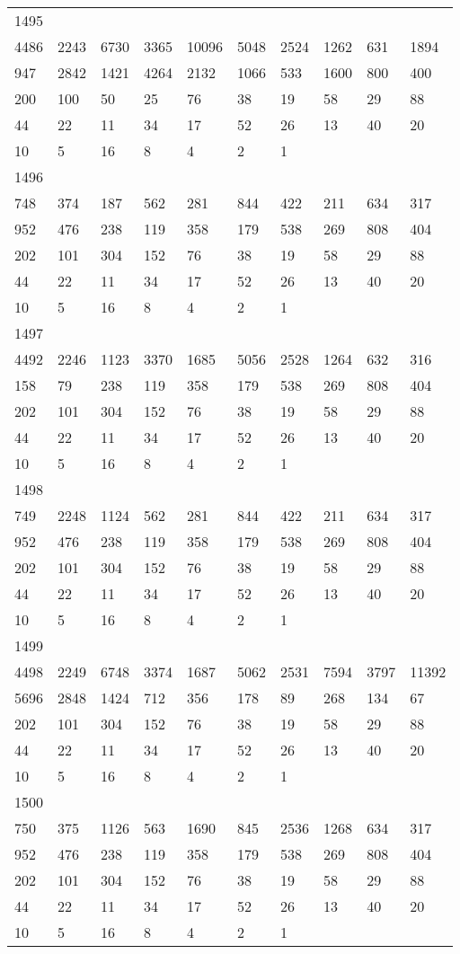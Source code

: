 \begin{longtable}{*{10}{l}}
1495&&&&&&&&&\\
4486& 2243& 6730& 3365& 10096& 5048& 2524& 1262& 631& 1894\\
947& 2842& 1421& 4264& 2132& 1066& 533& 1600& 800& 400\\
200& 100& 50& 25& 76& 38& 19& 58& 29& 88\\
44& 22& 11& 34& 17& 52& 26& 13& 40& 20\\
10& 5& 16& 8& 4& 2& 1& \\

1496&&&&&&&&&\\
748& 374& 187& 562& 281& 844& 422& 211& 634& 317\\
952& 476& 238& 119& 358& 179& 538& 269& 808& 404\\
202& 101& 304& 152& 76& 38& 19& 58& 29& 88\\
44& 22& 11& 34& 17& 52& 26& 13& 40& 20\\
10& 5& 16& 8& 4& 2& 1& \\

1497&&&&&&&&&\\
4492& 2246& 1123& 3370& 1685& 5056& 2528& 1264& 632& 316\\
158& 79& 238& 119& 358& 179& 538& 269& 808& 404\\
202& 101& 304& 152& 76& 38& 19& 58& 29& 88\\
44& 22& 11& 34& 17& 52& 26& 13& 40& 20\\
10& 5& 16& 8& 4& 2& 1& \\

1498&&&&&&&&&\\
749& 2248& 1124& 562& 281& 844& 422& 211& 634& 317\\
952& 476& 238& 119& 358& 179& 538& 269& 808& 404\\
202& 101& 304& 152& 76& 38& 19& 58& 29& 88\\
44& 22& 11& 34& 17& 52& 26& 13& 40& 20\\
10& 5& 16& 8& 4& 2& 1& \\

1499&&&&&&&&&\\
4498& 2249& 6748& 3374& 1687& 5062& 2531& 7594& 3797& 11392\\
5696& 2848& 1424& 712& 356& 178& 89& 268& 134& 67\\
202& 101& 304& 152& 76& 38& 19& 58& 29& 88\\
44& 22& 11& 34& 17& 52& 26& 13& 40& 20\\
10& 5& 16& 8& 4& 2& 1& \\

1500&&&&&&&&&\\
750& 375& 1126& 563& 1690& 845& 2536& 1268& 634& 317\\
952& 476& 238& 119& 358& 179& 538& 269& 808& 404\\
202& 101& 304& 152& 76& 38& 19& 58& 29& 88\\
44& 22& 11& 34& 17& 52& 26& 13& 40& 20\\
10& 5& 16& 8& 4& 2& 1& \\


\end{longtable}

